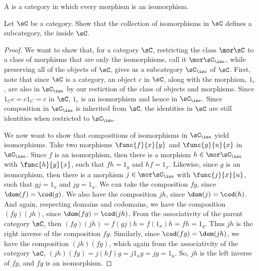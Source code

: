 \documentclass[main.tex]{subfiles}
\begin{document}
\begin{definition}
	A  is a category in which every morphism is an isomorphism.
\end{definition}
\popthm

\begin{exercise}
	Let \(\sC\) be a category. Show that the collection of isomorphisms in
	\(\sC\) defines a subcategory, the  inside \(\sC\).
\end{exercise}

\begin{proof}
	We want to show that, for a category \(\sC\), restricting the class
	\(\mor\sC\) to a class of morphisms that are only the isomorphisms, call it
	\(\mor\sC_\iso\), while preserving all of the objects of \(\sC\), gives us
	a subcategory \(\sC_\iso\) of \(\sC\).
	First, note that since $ \sC$ is a category, an object $c$ in $ \sC$,  
	along with the morphism, $1_c$, are also in $ \sC_\iso$ by our 
	restiction of the class of objects and morphisms. Since $1_Cc = c 1_C = 
	c$ in $ \sC$, $1_c$ is an isomorphism and hence in $ 
	\sC_\iso.$ Since composition in $ \sC_\iso $ is inherited from $ \sC,$  the
	identities in $ \sC$ are still identities when restricted to $ \sC_\iso.$		

	We now want to show that compositions of isomorphisms in \(\sC_\iso\) yield
	isomorphisms. Take two morphisms \(\func{f}{x}{y}\) and \(\func{g}{u}{x}\)
	in \(\sC_\iso\). Since \(f\) is an isomorphism, then there is a morphism
	\(h\in\mor\sC_\iso\) with \(\func{h}{y}{x}\), such that \(fh=1_y\) and
	\(hf=1_x\). Likewise, since \(g\) is an isomorphism, then there is a
	morphism \(j\in\mor\sC_\iso\) with \(\func{j}{x}{u}\), such that \(gj=1_x\)
	and \(jg=1_u\). We can take the composition \(fg\), since
	\(\dom(f)=\cod(g)\). We also have the composition \(jh\), since
	\(\dom(j)=\cod(h)\). And again, respecting domains and codomains, we have
	the composition \((fg)(jh)\), since \(\dom(fg)=\cod(jh)\). From the
	associativity of the parent category \(\sC\), then
	\((fg)(jh)=f(gj)h=f(1_x)h=fh=1_y\). Thus \(jh\) is the right inverse of the
	composition \(fg\). Similarly, since \(\cod(fg)=\dom(jh)\), we have the
	composition \((jh)(fg)\), which again from the associativity of the category
	\(\sC\), \((jh)(fg)=j(hf)g=j1_xg=jg=1_u\). So, \(jh\) is the left inverse of
	\(fg\), and \(fg\) is an isomorphism.


\end{proof}
\end{document}
